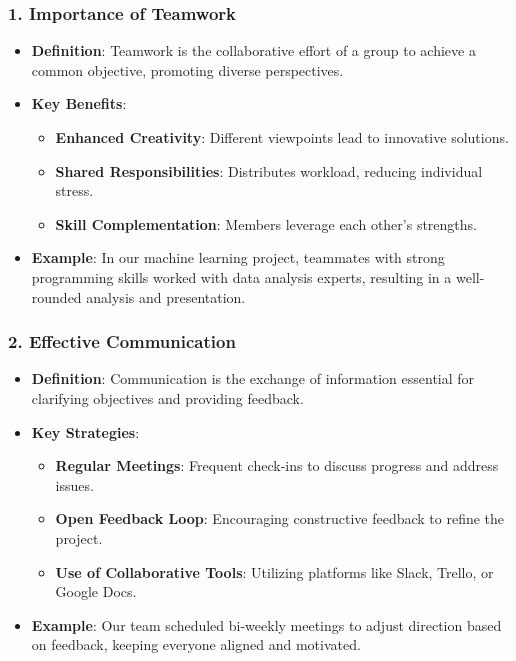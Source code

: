 \documentclass[aspectratio=169]{beamer}
\begin{document}
\begin{frame}[fragile]
    \frametitle{1. Importance of Teamwork}
    \begin{itemize}
        \item \textbf{Definition}: Teamwork is the collaborative effort of a group to achieve a common objective, promoting diverse perspectives.
        \item \textbf{Key Benefits}:
        \begin{itemize}
            \item \textbf{Enhanced Creativity}: Different viewpoints lead to innovative solutions.
            \item \textbf{Shared Responsibilities}: Distributes workload, reducing individual stress.
            \item \textbf{Skill Complementation}: Members leverage each other's strengths.
        \end{itemize}
        \item \textbf{Example}: In our machine learning project, teammates with strong programming skills worked with data analysis experts, resulting in a well-rounded analysis and presentation.
    \end{itemize}
\end{frame}

\begin{frame}[fragile]
    \frametitle{2. Effective Communication}
    \begin{itemize}
        \item \textbf{Definition}: Communication is the exchange of information essential for clarifying objectives and providing feedback.
        \item \textbf{Key Strategies}:
        \begin{itemize}
            \item \textbf{Regular Meetings}: Frequent check-ins to discuss progress and address issues.
            \item \textbf{Open Feedback Loop}: Encouraging constructive feedback to refine the project.
            \item \textbf{Use of Collaborative Tools}: Utilizing platforms like Slack, Trello, or Google Docs.
        \end{itemize}
        \item \textbf{Example}: Our team scheduled bi-weekly meetings to adjust direction based on feedback, keeping everyone aligned and motivated.
    \end{itemize}
\end{frame}
\end{document}
